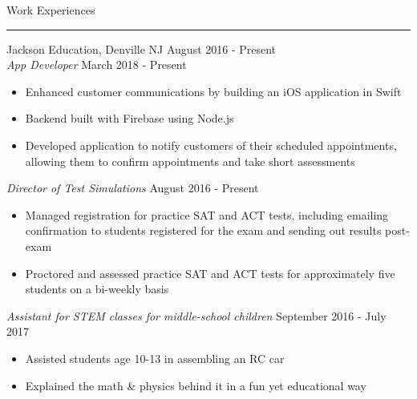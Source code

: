 \documentclass{article}
\newcommand \spacingBetweenHeadings {0.5em}
\begin{document}
\noindent
\huge Work Experiences\par
\vspace{0.1em}
\hrule
\Large
\vspace{1em}
\noindent
Jackson Education, Denville NJ
\hfill
August 2016 - Present\\
\textit{App Developer}
\hfill
March 2018 - Present\\
\vspace{-1em}
\begin{itemize}
\item Enhanced customer communications by building an iOS application in Swift
\item Backend built with Firebase using Node.js
\item Developed application to notify customers of their scheduled appointments, allowing them to confirm appointments and take short assessments
\end{itemize}
\textit{Director of Test Simulations}
\hfill
August 2016 - Present\\
\vspace{-1em}
\begin{itemize}
\item Managed registration for practice SAT and ACT tests, including emailing confirmation to students registered for the exam and sending out results post-exam
\item Proctored and assessed practice SAT and ACT tests for approximately five students on a bi-weekly basis
\end{itemize}
\textit{Assistant for STEM classes for middle-school children}
\hfill
September 2016 - July 2017
\begin{itemize}
\item Assisted students age 10-13 in assembling an RC car
\item Explained the math \& physics behind it in a fun yet educational way
\end{itemize}
\vspace{\spacingBetweenHeadings}
\end{document}
